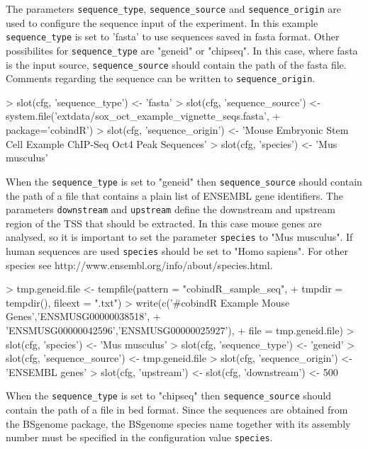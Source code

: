 \documentclass{article}
\begin{document}
The parameters \texttt{sequence\_type}, \texttt{sequence\_source} and 
\texttt{sequence\_origin} are used to configure the sequence input of the 
experiment. In this example \texttt{sequence\_type} is set to 'fasta' to use sequences saved in fasta format. Other possibilites for \texttt{sequence\_type} are "geneid" or "chipseq". In this case, where fasta is the input source, \texttt{sequence\_source} should contain the path of the fasta file. Comments regarding the sequence can be written to \texttt{sequence\_origin}.

\begin{Schunk}
\begin{Sinput}
> slot(cfg, 'sequence_type') <- 'fasta'
> slot(cfg, 'sequence_source') <- system.file('extdata/sox_oct_example_vignette_seqs.fasta',
+                                             package='cobindR')
> slot(cfg, 'sequence_origin') <- 'Mouse Embryonic Stem Cell Example ChIP-Seq Oct4 Peak Sequences'
> slot(cfg, 'species') <- 'Mus musculus'
\end{Sinput}
\end{Schunk}

When the \texttt{sequence\_type} is set to "geneid" then \texttt{sequence\_source} should contain the path of a file that contains a plain list of ENSEMBL gene identifiers. The parameters \texttt{downstream} and 
\texttt{upstream} define the downstream and upstream region of the TSS that should be extracted. In this case mouse genes are analysed, so it is important to set the parameter \texttt{species} to "Mus musculus". If human sequences are used \texttt{species} should be set to "Homo sapiens". For other species see http://www.ensembl.org/info/about/species.html.

\begin{Schunk}
\begin{Sinput}
> tmp.geneid.file <- tempfile(pattern = "cobindR_sample_seq", 
+                      tmpdir = tempdir(), fileext = ".txt")
> write(c('#cobindR Example Mouse Genes','ENSMUSG00000038518',
+ 		'ENSMUSG00000042596','ENSMUSG00000025927'),
+ 		file = tmp.geneid.file)
> slot(cfg, 'species') <- 'Mus musculus'
> slot(cfg, 'sequence_type') <- 'geneid'
> slot(cfg, 'sequence_source') <- tmp.geneid.file
> slot(cfg, 'sequence_origin') <- 'ENSEMBL genes'
> slot(cfg, 'upstream') <- slot(cfg, 'downstream') <- 500
\end{Sinput}
\end{Schunk}

When the \texttt{sequence\_type} is set to "chipseq" then \texttt{sequence\_source} should contain the path of a file in bed format. Since the sequences are obtained from the BSgenome package, the BSgenome  
species name together with its assembly number must be specified in the 
configuration value \texttt{species}.
\end{document}
